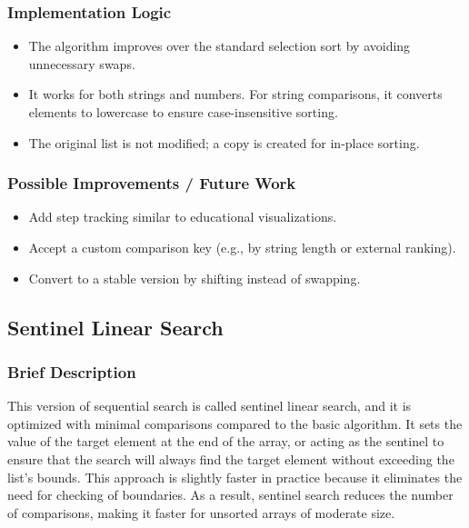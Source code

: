 \documentclass{article}
\begin{document}
\subsubsection*{Implementation Logic}
\begin{itemize}
    \item The algorithm improves over the standard selection sort by avoiding unnecessary swaps.
    \item It works for both strings and numbers. For string comparisons, it converts elements to lowercase to ensure case-insensitive sorting.
    \item The original list is not modified; a copy is created for in-place sorting.
\end{itemize}
\subsubsection*{Possible Improvements / Future Work}
\begin{itemize}
    \item Add step tracking similar to educational visualizations.
    \item Accept a custom comparison key (e.g., by string length or external ranking).
    \item Convert to a stable version by shifting instead of swapping.
\end{itemize}


\subsection{Sentinel Linear Search}
\subsubsection*{Brief Description}
This  version of sequential search is called sentinel linear search, and it is optimized with minimal comparisons compared to the basic algorithm. It sets the value of the target element at the end of the array, or acting as the sentinel to ensure that the search will always find the target element without exceeding the list's bounds. This approach is slightly faster in practice because it eliminates the need for checking of boundaries. As a result, sentinel search reduces the number of comparisons, making it faster for unsorted arrays of moderate size. 
\end{document}
